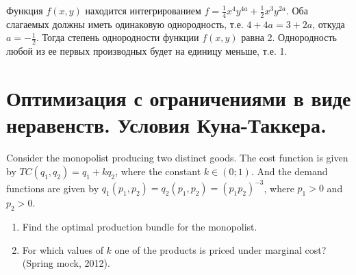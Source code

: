 \begin{solution}
Функция $f(x,y)$ находится интегрированием $f=\frac{1}{4} x^{4} y^{4a} +\frac{1}{2} x^{3} y^{2a} $. Оба слагаемых должны иметь одинаковую однородность, т.е. $4+4a=3+2a$, откуда $a=-\frac{1}{2} $. Тогда степень однородности функции $f(x,y)$ равна 2. Однородность любой из ее первых производных будет на единицу меньше, т.е. 1.
\end{solution}




\section{Оптимизация с ограничениями в виде неравенств. Условия Куна-Таккера.}

\begin{problem}
Consider the monopolist producing two distinct goods. The cost function is given by $TC(q_{1} ,q_{2} )=q_{1} +kq_{2} $, where the constant $k\in (0;1)$. And the demand functions are given by $q_{1} (p_{1} ,p_{2} )=q_{2} (p_{1} ,p_{2} )=(p_{1} p_{2} )^{-3} $, where $p_1>0$ and $p_2>0$.

\begin{enumerate}
\item Find the optimal production bundle for the monopolist.
\item For which values of  $k$ one of the products is priced under marginal cost? (Spring mock, 2012).
\end{enumerate}
\end{problem}


